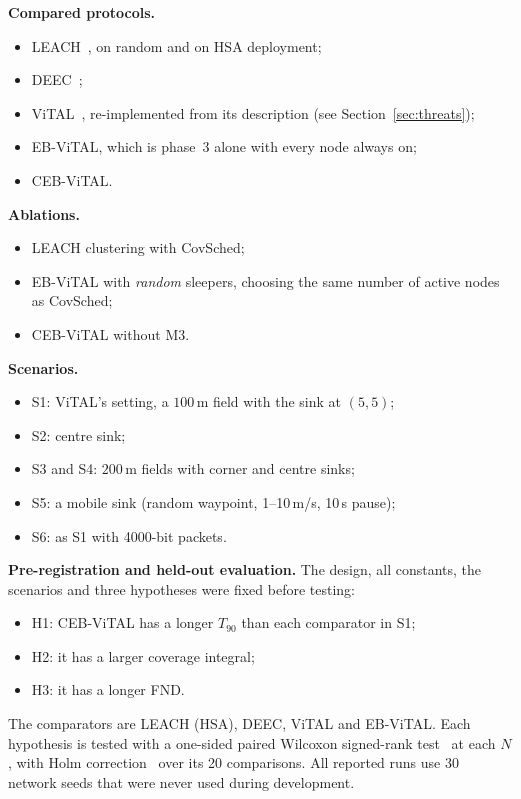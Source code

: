 \documentclass[journal]{IEEEtran}
\newcommand{\TN}{T_{90}}
\begin{document}
\textbf{Compared protocols.}
\begin{itemize}
\item LEACH~\cite{heinzelman2000leach}, on random and on HSA deployment;
\item DEEC~\cite{qing2006deec};
\item ViTAL~\cite{ali2025vital}, re-implemented from its description (see Section~\ref{sec:threats});
\item EB-ViTAL, which is phase~3 alone with every node always on;
\item CEB-ViTAL.
\end{itemize}

\textbf{Ablations.}
\begin{itemize}
\item LEACH clustering with CovSched;
\item EB-ViTAL with \emph{random} sleepers, choosing the same number of active nodes as CovSched;
\item CEB-ViTAL without M3.
\end{itemize}

\textbf{Scenarios.}
\begin{itemize}
\item S1: ViTAL's setting, a $100\,$m field with the sink at $(5,5)$;
\item S2: centre sink;
\item S3 and S4: $200\,$m fields with corner and centre sinks;
\item S5: a mobile sink (random waypoint, 1--10\,m/s, 10\,s pause);
\item S6: as S1 with 4000-bit packets.
\end{itemize}

\textbf{Pre-registration and held-out evaluation.} The design, all constants, the scenarios and three hypotheses were fixed before testing:
\begin{itemize}
\item H1: CEB-ViTAL has a longer $\TN$ than each comparator in S1;
\item H2: it has a larger coverage integral;
\item H3: it has a longer FND.
\end{itemize}
The comparators are LEACH (HSA), DEEC, ViTAL and EB-ViTAL. Each hypothesis is tested with a one-sided paired Wilcoxon signed-rank test~\cite{wilcoxon1945} at each $N$, with Holm correction~\cite{holm1979} over its 20 comparisons. All reported runs use 30 network seeds that were never used during development.
\end{document}

